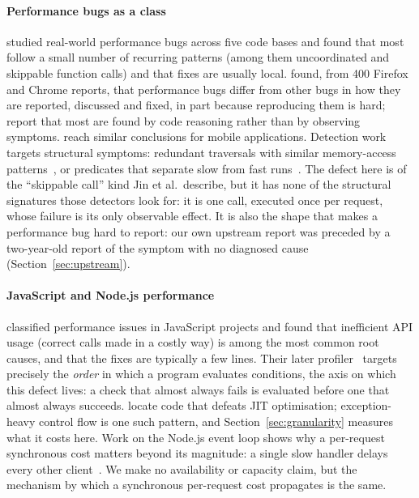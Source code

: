 \documentclass[preprint,12pt,authoryear]{elsarticle}
\begin{document}
\paragraph{Performance bugs as a class} \citet{jin2012understanding} studied real-world performance bugs across five
code bases and found that most follow a small number of recurring patterns (among them uncoordinated and skippable function calls) and that fixes are
usually local. \citet{zaman2012qualitative} found, from 400
Firefox and Chrome reports, that performance bugs differ from other bugs in
how they are reported, discussed and fixed, in part because reproducing them
is hard; \citet{nistor2013discovering} report that most are found
by code reasoning rather than by observing symptoms. \citet{liu2014characterizing} reach similar conclusions for mobile
applications. Detection work targets structural symptoms: redundant traversals
with similar memory-access patterns~\citep{nistor2013toddler}, or predicates
that separate slow from fast runs~\citep{song2014statistical}. The defect here
is of the ``skippable call'' kind Jin et al.\ describe, but it has none of the
structural signatures those detectors look for: it is one call, executed once
per request, whose failure is its only observable effect. It is also the shape
that makes a performance bug hard to report: our own upstream report was
preceded by a two-year-old report of the symptom with no diagnosed cause
(Section~\ref{sec:upstream}).

\paragraph{JavaScript and Node.js performance} \citet{selakovic2016performance} classified performance issues in
JavaScript projects and found that inefficient API usage (correct calls made
in a costly way) is among the most common root causes, and that the fixes
are typically a few lines. Their later profiler~\citep{selakovic2017actionable}
targets precisely the \emph{order} in which a program evaluates conditions, the
axis on which this defect lives: a check that almost always fails is evaluated
before one that almost always succeeds. \citet{gong2015jitprof}
locate code that defeats JIT optimisation; exception-heavy control flow is one
such pattern, and Section~\ref{sec:granularity} measures what it costs here.
Work on the Node.js event loop shows why a per-request synchronous cost matters
beyond its magnitude: a single slow handler delays every other
client~\citep{davis2018sense,staicu2018freezing}. We make no availability or
capacity claim, but the mechanism by which a synchronous per-request cost
propagates is the same.
\end{document}
